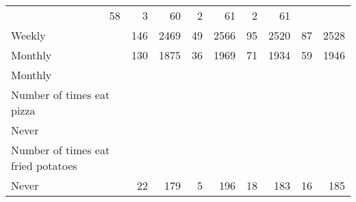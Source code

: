 \documentclass{article}
\begin{document}
\begin{tabular}{lllllllll}
  \multicolumn{1}{r}{58} &
  \multicolumn{1}{r}{3} &
  \multicolumn{1}{r}{60} &
  \multicolumn{1}{r}{2} &
  \multicolumn{1}{r}{61} &
  \multicolumn{1}{r}{2} &
  \multicolumn{1}{r}{61} \\
\multicolumn{1}{l}{\hspace{5em}Weekly} &
  \multicolumn{1}{|r}{146} &
  \multicolumn{1}{r}{2469} &
  \multicolumn{1}{r}{49} &
  \multicolumn{1}{r}{2566} &
  \multicolumn{1}{r}{95} &
  \multicolumn{1}{r}{2520} &
  \multicolumn{1}{r}{87} &
  \multicolumn{1}{r}{2528} \\
\multicolumn{1}{l}{\hspace{5em}Monthly} &
  \multicolumn{1}{|r}{130} &
  \multicolumn{1}{r}{1875} &
  \multicolumn{1}{r}{36} &
  \multicolumn{1}{r}{1969} &
  \multicolumn{1}{r}{71} &
  \multicolumn{1}{r}{1934} &
  \multicolumn{1}{r}{59} &
  \multicolumn{1}{r}{1946} \\
\multicolumn{1}{l}{\hspace{1em}Monthly} &
  \multicolumn{1}{|r}{} &
  \multicolumn{1}{r}{} &
  \multicolumn{1}{r}{} &
  \multicolumn{1}{r}{} &
  \multicolumn{1}{r}{} &
  \multicolumn{1}{r}{} &
  \multicolumn{1}{r}{} &
  \multicolumn{1}{r}{} \\
\multicolumn{1}{l}{\hspace{2em}Number of times eat pizza} &
  \multicolumn{1}{|r}{} &
  \multicolumn{1}{r}{} &
  \multicolumn{1}{r}{} &
  \multicolumn{1}{r}{} &
  \multicolumn{1}{r}{} &
  \multicolumn{1}{r}{} &
  \multicolumn{1}{r}{} &
  \multicolumn{1}{r}{} \\
\multicolumn{1}{l}{\hspace{3em}Never} &
  \multicolumn{1}{|r}{} &
  \multicolumn{1}{r}{} &
  \multicolumn{1}{r}{} &
  \multicolumn{1}{r}{} &
  \multicolumn{1}{r}{} &
  \multicolumn{1}{r}{} &
  \multicolumn{1}{r}{} &
  \multicolumn{1}{r}{} \\
\multicolumn{1}{l}{\hspace{4em}Number of times eat fried potatoes} &
  \multicolumn{1}{|r}{} &
  \multicolumn{1}{r}{} &
  \multicolumn{1}{r}{} &
  \multicolumn{1}{r}{} &
  \multicolumn{1}{r}{} &
  \multicolumn{1}{r}{} &
  \multicolumn{1}{r}{} &
  \multicolumn{1}{r}{} \\
\multicolumn{1}{l}{\hspace{5em}Never} &
  \multicolumn{1}{|r}{22} &
  \multicolumn{1}{r}{179} &
  \multicolumn{1}{r}{5} &
  \multicolumn{1}{r}{196} &
  \multicolumn{1}{r}{18} &
  \multicolumn{1}{r}{183} &
  \multicolumn{1}{r}{16} &
  \multicolumn{1}{r}{185} \\

\end{tabular}
\end{document}

